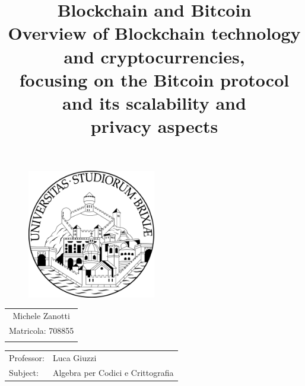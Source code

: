 \documentclass[12pt, a4paper]{article}
\title{
  \textbf{Blockchain and Bitcoin} \\
  \large Overview of Blockchain technology and cryptocurrencies, \\
  focusing on the Bitcoin protocol and its scalability and \\ privacy aspects
}
\date{}
\theoremstyle{definition}
\theoremstyle{remark}
\begin{document}
  \maketitle
  
  \begin{figure}[h!]
		\begin{center}
			\includegraphics[width=0.5\textwidth]{img/1017px-Logo_unibs.png} 
		\end{center}
	\end{figure}
	
	\begin{center}
    
		\begin{tabular}{c}
        	Michele Zanotti\\
        	Matricola: 708855\\
        	\\
        \end{tabular}

        \begin{tabular}{l l}
        	Professor:&  Luca Giuzzi \\
       		Subject:& Algebra per Codici e Crittografia \\ %
        \end{tabular}
		
	\end{center}
    \pagebreak
  
  \tableofcontents

  
  
  
  
  
  
  

  \printbibliography
\end{document}
